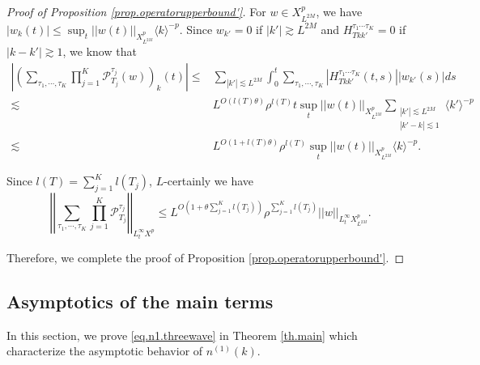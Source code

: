 \begin{proof}[Proof of Proposition \ref{prop.operatorupperbound'}]
For $w\in X^{p}_{L^{2M}}$, we have $|w_k(t)|\le \sup_{t}||w(t)||_{X^{p}_{L^{2M}}} \langle k\rangle^{-p}$. Since $w_{k'}=0$ if $|k'|\gtrsim L^{2M}$ and $H^{\tau_1\cdots \tau_{K}}_{Tkk'}=0$ if $|k-k'|\gtrsim 1$, we know that
\begin{equation}
\begin{split}
    \left|\left(\sum_{\tau_1,\cdots, \tau_{K}}\prod_{j=1}^K\mathcal{P}^{\tau_j}_{T_j}(w)\right)_{k}(t)\right|\le&\sum_{|k'|\lesssim L^{2M}}\int_0^t \sum_{\tau_1,\cdots, \tau_{K}}|H^{\tau_1\cdots \tau_{K}}_{Tkk'}(t,s)| |w_{k'}(s)| ds
    \\
    \lesssim&  L^{O(l(T)\theta)}  \rho^{l(T)}t \sup_{t}||w(t)||_{X^{p}_{L^{2M}}} \sum_{\substack{|k'|\lesssim L^{2M}\\ |k'-k|\lesssim 1}} \langle k'\rangle^{-p}
    \\
    \lesssim& L^{O(1+l(T)\theta)}  \rho^{l(T)} \sup_{t}||w(t)||_{X^{p}_{L^{2M}}}  \langle k\rangle^{-p}.
\end{split}
\end{equation}

Since $l(T)=\sum_{j=1}^K l(T_j)$, $L$-certainly we have 
\begin{equation}
    \left|\left|\sum_{\tau_1,\cdots,\tau_K}\prod_{j=1}^K\mathcal{P}^{\tau_j}_{T_j}\right|\right|_{L_t^{\infty}X^{p}}\le L^{O\left(1+\theta\sum_{j=1}^K l(T_j)\right)} \rho^{\sum_{j=1}^K l(T_j)}||w||_{L_t^{\infty}X^{p}_{L^{2M}}}.
\end{equation}

Therefore, we complete the proof of Proposition \ref{prop.operatorupperbound'}.
\end{proof}



\subsection{Asymptotics of the main terms} In this section, we prove \eqref{eq.n1.threewave} in Theorem \ref{th.main} which characterize the asymptotic behavior of $n^{(1)}(k)$.

